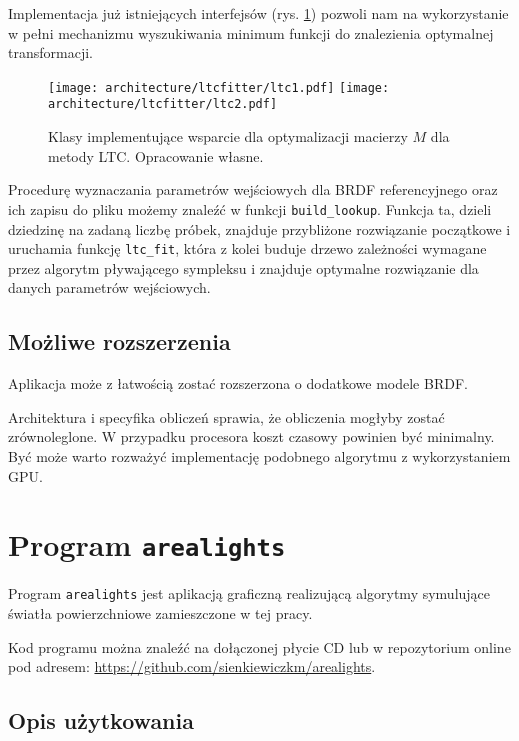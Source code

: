 \documentclass[../main.tex]{subfiles}
\newcommand{\graphvizscale}{0.09}
\begin{document}
Implementacja już istniejących interfejsów (rys. \ref{fig:LTCClassDiagram}) pozwoli nam na wykorzystanie w pełni mechanizmu wyszukiwania minimum funkcji do znalezienia optymalnej transformacji.

\begin{figure}[h]
    \centering
    \texttt{[image: architecture/ltcfitter/ltc1.pdf]}
    \texttt{[image: architecture/ltcfitter/ltc2.pdf]}
    \caption{Klasy implementujące wsparcie dla optymalizacji macierzy $M$ dla metody LTC. Opracowanie własne.}
    \label{fig:LTCClassDiagram}
\end{figure}

Procedurę wyznaczania parametrów wejściowych dla BRDF referencyjnego oraz ich zapisu do pliku możemy znaleźć w funkcji \texttt{build\_lookup}. Funkcja ta, dzieli dziedzinę na zadaną liczbę próbek, znajduje przybliżone rozwiązanie początkowe i uruchamia funkcję \texttt{ltc\_fit}, która z kolei buduje drzewo zależności wymagane przez algorytm pływającego sympleksu i znajduje optymalne rozwiązanie dla danych parametrów wejściowych.

\subsection{Możliwe rozszerzenia}

Aplikacja może z łatwością zostać rozszerzona o dodatkowe modele BRDF.

Architektura i specyfika obliczeń sprawia, że obliczenia mogłyby zostać zrównoleglone. W przypadku procesora koszt czasowy powinien być minimalny. Być może warto rozważyć implementację podobnego algorytmu z wykorzystaniem GPU.

\section{Program \texttt{arealights}}

Program \texttt{arealights} jest aplikacją graficzną realizującą algorytmy symulujące światła powierzchniowe zamieszczone w tej pracy.

Kod programu można znaleźć na dołączonej płycie CD lub w repozytorium online pod adresem: \url{https://github.com/sienkiewiczkm/arealights}.

\subsection{Opis użytkowania}
\end{document}
